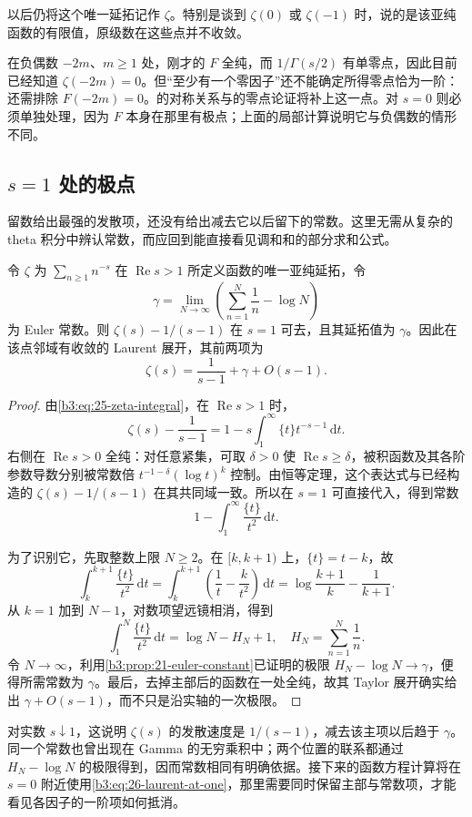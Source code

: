 以后仍将这个唯一延拓记作 \(\zeta\)。特别是谈到 \(\zeta(0)\) 或 \(\zeta(-1)\) 时，说的是该亚纯函数的有限值，原级数在这些点并不收敛。

\ProseParagraphBreak

在负偶数 \(-2m\)、\(m\ge1\) 处，刚才的 \(F\) 全纯，而 \(1/\Gamma(s/2)\) 有单零点，因此目前已经知道 \(\zeta(-2m)=0\)。但“至少有一个零因子”还不能确定所得零点恰为一阶：还需排除 \(F(-2m)=0\)。的对称关系与的零点论证将补上这一点。对 \(s=0\) 则必须单独处理，因为 \(F\) 本身在那里有极点；上面的局部计算说明它与负偶数的情形不同。

\subsection{\texorpdfstring{\(s=1\)}{s=1} 处的极点}
\label{b3:subsec:260304}

留数给出最强的发散项，还没有给出减去它以后留下的常数。这里无需从复杂的 theta 积分中辨认常数，而应回到能直接看见调和和的部分求和公式。

\begin{proposition}\label{b3:prop:26-laurent-at-one}
令 \(\zeta\) 为 \(\sum_{n\ge1}n^{-s}\) 在 \(\operatorname{Re}s>1\) 所定义函数的唯一亚纯延拓，令
\[
 \gamma=\lim_{N\to\infty}\left(\sum_{n=1}^N\frac1n-\log N\right)
\]
为 Euler 常数。则 \(\zeta(s)-1/(s-1)\) 在 \(s=1\) 可去，且其延拓值为 \(\gamma\)。因此在该点邻域有收敛的 Laurent 展开，其前两项为
\begin{equation}\label{b3:eq:26-laurent-at-one}
 \zeta(s)=\frac1{s-1}+\gamma+O(s-1).
\end{equation}
\end{proposition}
\begin{proof}
由\eqref{b3:eq:25-zeta-integral}，在 \(\operatorname{Re}s>1\) 时，
\[
 \zeta(s)-\frac1{s-1}
 =1-s\int_1^\infty\{t\}t^{-s-1}\,\mathrm dt.
\]
右侧在 \(\operatorname{Re}s>0\) 全纯：对任意紧集，可取 \(\delta>0\) 使 \(\operatorname{Re}s\ge\delta\)，被积函数及其各阶参数导数分别被常数倍 \(t^{-1-\delta}(\log t)^k\) 控制。由恒等定理，这个表达式与已经构造的 \(\zeta(s)-1/(s-1)\) 在其共同域一致。所以在 \(s=1\) 可直接代入，得到常数
\[
 1-\int_1^\infty\frac{\{t\}}{t^2}\,\mathrm dt.
\]

为了识别它，先取整数上限 \(N\ge2\)。在 \([k,k+1)\) 上，\(\{t\}=t-k\)，故
\[
 \int_k^{k+1}\frac{\{t\}}{t^2}\,\mathrm dt
 =\int_k^{k+1}\left(\frac1t-\frac{k}{t^2}\right)\,\mathrm dt
 =\log\frac{k+1}{k}-\frac1{k+1}.
\]
从 \(k=1\) 加到 \(N-1\)，对数项望远镜相消，得到
\[
 \int_1^N\frac{\{t\}}{t^2}\,\mathrm dt
 =\log N-H_N+1,
 \quad H_N=\sum_{n=1}^N\frac1n.
\]
令 \(N\to\infty\)，利用\cref{b3:prop:21-euler-constant}已证明的极限 \(H_N-\log N\to\gamma\)，便得所需常数为 \(\gamma\)。最后，去掉主部后的函数在一处全纯，故其 Taylor 展开确实给出 \(\gamma+O(s-1)\)，而不只是沿实轴的一次极限。
\end{proof}

对实数 \(s\downarrow1\)，这说明 \(\zeta(s)\) 的发散速度是 \(1/(s-1)\)，减去该主项以后趋于 \(\gamma\)。同一个常数也曾出现在 Gamma 的无穷乘积中；两个位置的联系都通过 \(H_N-\log N\) 的极限得到，因而常数相同有明确依据。接下来的函数方程计算将在 \(s=0\) 附近使用\eqref{b3:eq:26-laurent-at-one}，那里需要同时保留主部与常数项，才能看见各因子的一阶项如何抵消。
